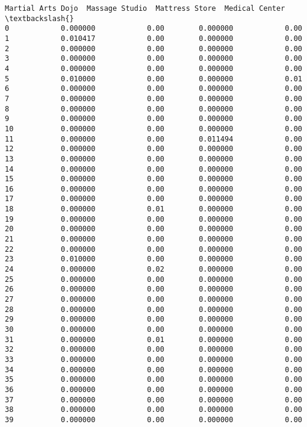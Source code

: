 \documentclass[11pt]{article}
\begin{document}
\begin{tcolorbox}[breakable, size=fbox, boxrule=.5pt, pad at break*=1mm, opacityfill=0]
\begin{Verbatim}[commandchars=\\\{\}]
    Martial Arts Dojo  Massage Studio  Mattress Store  Medical Center  \textbackslash{}
0            0.000000            0.00        0.000000            0.00
1            0.010417            0.00        0.000000            0.00
2            0.000000            0.00        0.000000            0.00
3            0.000000            0.00        0.000000            0.00
4            0.000000            0.00        0.000000            0.00
5            0.010000            0.00        0.000000            0.01
6            0.000000            0.00        0.000000            0.00
7            0.000000            0.00        0.000000            0.00
8            0.000000            0.00        0.000000            0.00
9            0.000000            0.00        0.000000            0.00
10           0.000000            0.00        0.000000            0.00
11           0.000000            0.00        0.011494            0.00
12           0.000000            0.00        0.000000            0.00
13           0.000000            0.00        0.000000            0.00
14           0.000000            0.00        0.000000            0.00
15           0.000000            0.00        0.000000            0.00
16           0.000000            0.00        0.000000            0.00
17           0.000000            0.00        0.000000            0.00
18           0.000000            0.01        0.000000            0.00
19           0.000000            0.00        0.000000            0.00
20           0.000000            0.00        0.000000            0.00
21           0.000000            0.00        0.000000            0.00
22           0.000000            0.00        0.000000            0.00
23           0.010000            0.00        0.000000            0.00
24           0.000000            0.02        0.000000            0.00
25           0.000000            0.00        0.000000            0.00
26           0.000000            0.00        0.000000            0.00
27           0.000000            0.00        0.000000            0.00
28           0.000000            0.00        0.000000            0.00
29           0.000000            0.00        0.000000            0.00
30           0.000000            0.00        0.000000            0.00
31           0.000000            0.01        0.000000            0.00
32           0.000000            0.00        0.000000            0.00
33           0.000000            0.00        0.000000            0.00
34           0.000000            0.00        0.000000            0.00
35           0.000000            0.00        0.000000            0.00
36           0.000000            0.00        0.000000            0.00
37           0.000000            0.00        0.000000            0.00
38           0.000000            0.00        0.000000            0.00
39           0.000000            0.00        0.000000            0.00


\end{Verbatim}
\end{tcolorbox}
\end{document}

